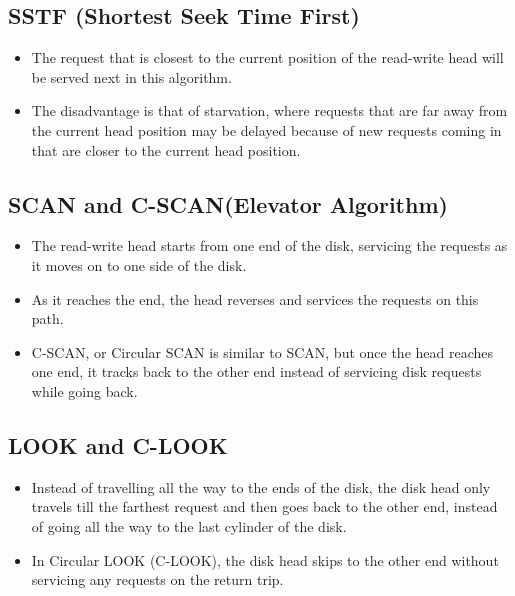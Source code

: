 \documentclass{article}
\theoremstyle{plain}
\theoremstyle{definition}
\begin{document}
\subsection{SSTF (Shortest Seek Time First)}
\begin{itemize}
    \item The request that is closest to the current position of the read-write head will be served next in this algorithm.
    
    \item The disadvantage is that of starvation, where requests that are far away from the current head position may be delayed because of new requests coming in that are closer to the current head position.
\end{itemize}

\subsection{SCAN and C-SCAN(Elevator Algorithm)}
\begin{itemize}
    \item The read-write head starts from one end of the disk, servicing the requests as it moves on to one side of the disk. 
    
    \item As it reaches the end, the head reverses and services the requests on this path. 
    
    \item C-SCAN, or Circular SCAN is similar to SCAN, but once the head reaches one end, it tracks back to the other end instead of servicing disk requests while going back. 
\end{itemize}

\subsection{LOOK and C-LOOK}
\begin{itemize}
    \item Instead of travelling all the way to the ends of the disk, the disk head only travels till the farthest request and then goes back to the other end, instead of going all the way to the last cylinder of the disk.
    
    \item In Circular LOOK (C-LOOK), the disk head skips to the other end without servicing any requests on the return trip. 
\end{itemize}
\end{document}
